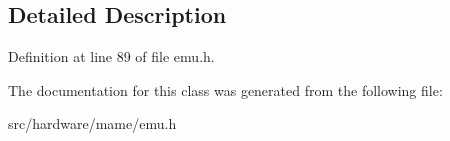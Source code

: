 \subsection{Detailed Description}


Definition at line 89 of file emu.\-h.



The documentation for this class was generated from the following file\-:\begin{DoxyCompactItemize}
\item 
src/hardware/mame/emu.\-h\end{DoxyCompactItemize}
